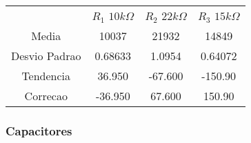 \documentclass[12pt,twoside, a4paper, twocolumn]{article}
\begin{document}
\begin{center}
    \begin{tabular}{ |c|c|c|c| }
        \hline
                      & $R_1$ $10k\varOmega$ & $R_2$ $22k\varOmega$ & $R_3$ $15k\varOmega$ \\
        Media         & 10037                & 21932                & 14849                \\
        Desvio Padrao & 0.68633              & 1.0954               & 0.64072              \\
        Tendencia     & 36.950               & -67.600              & -150.90              \\
        Correcao      & -36.950              & 67.600               & 150.90               \\


        \hline
    \end{tabular}
\end{center}

\subsubsection{Capacitores}
\end{document}
